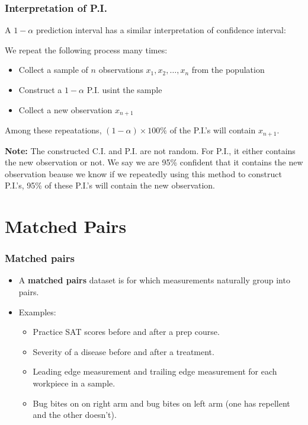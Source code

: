 \documentclass[handout]{beamer}\usepackage[]{graphicx}\usepackage[]{color}
\numberwithin{equation}{section}
\begin{document}
\begin{frame}
\frametitle{Interpretation of P.I.}
A $1 - \alpha$ prediction interval has a similar interpretation of confidence interval: 

We repeat the following process many times: 
\begin{itemize}
\item
Collect a sample of $n$ observations $x_1, x_2, \ldots, x_n$ from the population
\item
Construct a $1 - \alpha$ P.I. usint the sample
\item
Collect a new observation $x_{n+1}$
\end{itemize}

Among these repeatations, $(1 - \alpha)\times 100\%$ of the P.I.'s will contain $x_{n+1}$.


{\bf Note:} The constructed C.I. and P.I. are not random. For P.I., it either contains the new observation or not. We say we are 95\% confident that it contains the new observation beause we know if we repeatedly using this method to construct P.I.'s, 95\% of these P.I.'s will contain the new observation. 
\end{frame}


\section{Matched Pairs}

\begin{frame}
\frametitle{Matched pairs}
\begin{itemize}
\item A {\bf matched pairs} dataset is for which measurements naturally group into pairs. 
\pause \item Examples:
\begin{itemize}
\item Practice SAT scores before and after a prep course.
\pause \item Severity of a disease before and after a treatment.
\pause \item Leading edge measurement and trailing edge measurement for each workpiece in a sample.
\pause \item Bug bites on on right arm and bug bites on left arm (one has repellent and the other doesn't). 
\end{itemize}
\end{itemize}
\end{frame}
\end{document}
